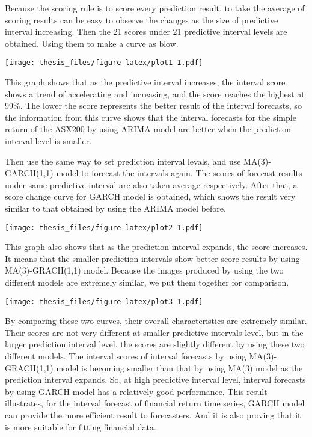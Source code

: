 \documentclass{monashthesis}
\theoremstyle{definition}
\theoremstyle{definition}
\theoremstyle{definition}
\theoremstyle{remark}
\begin{document}
Because the scoring rule is to score every prediction result, to take
the average of scoring results can be easy to observe the changes as the
size of predictive interval increasing. Then the 21 scores under 21
predictive interval levels are obtained. Using them to make a curve as
blow.

\texttt{[image: thesis\_files/figure-latex/plot1-1.pdf]}

This graph shows that as the predictive interval increases, the interval
score shows a trend of accelerating and increasing, and the score
reaches the highest at 99\%. The lower the score represents the better
result of the interval forecasts, so the information from this curve
shows that the interval forecasts for the simple return of the ASX200 by
using ARIMA model are better when the prediction interval level is
smaller.

Then use the same way to set prediction interval levals, and use
MA(3)-GARCH(1,1) model to forecast the intervals again. The scores of
forecast results under same predictive interval are also taken average
respectively. After that, a score change curve for GARCH model is
obtained, which shows the result very similar to that obtained by using
the ARIMA model before.

\texttt{[image: thesis\_files/figure-latex/plot2-1.pdf]}

This graph also shows that as the prediction interval expands, the score
increases. It means that the smaller prediction intervals show better
score results by using MA(3)-GRACH(1,1) model. Because the images
produced by using the two different models are extremely similar, we put
them together for comparison.

\texttt{[image: thesis\_files/figure-latex/plot3-1.pdf]}

By comparing these two curves, their overall characteristics are
extremely similar. Their scores are not very different at smaller
predictive intervals level, but in the larger prediction interval level,
the scores are slightly different by using these two different models.
The interval scores of interval forecasts by using MA(3)-GRACH(1,1)
model is becoming smaller than that by using MA(3) model as the
prediction interval expands. So, at high predictive interval level,
interval forecasts by using GARCH model has a relatively good
performance. This result illustrates, for the interval forecast of
financial return time series, GARCH model can provide the more efficient
result to forecasters. And it is also proving that it is more suitable
for fitting financial data.
\end{document}
